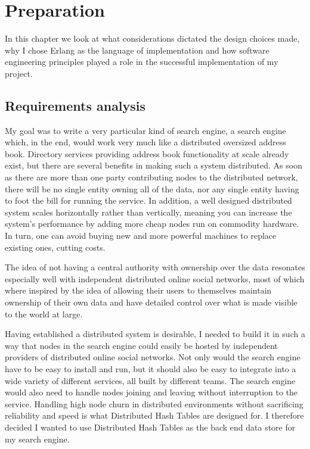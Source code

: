 

\chapter{Preparation}
In this chapter we look at what considerations dictated the design choices made, why I chose Erlang as the language of implementation and how software engineering principles played a role in the successful implementation of my project.

\section{Requirements analysis}
My goal was to write a very particular kind of search engine, a search engine which, in the end, would work very much like a distributed oversized address book.
Directory services providing address book functionality at scale already exist, but there are several benefits in making such a system distributed. As soon as there are more than one party contributing nodes to the distributed network, there will be no single entity owning all of the data, nor any single entity having to foot the bill for running the service. In addition, a well designed distributed system scales horizontally rather than vertically, meaning you can increase the system's performance by adding more cheap nodes run on commodity hardware. In turn, one can avoid buying new and more powerful machines to replace existing ones, cutting costs.

The idea of not having a central authority with ownership over the data resonates especially well with independent distributed online social networks, most of which where inspired by the idea of allowing their users to themselves maintain ownership of their own data and have detailed control over what is made visible to the world at large.

Having established a distributed system is desirable, I needed to build it in such a way that nodes in the search engine could easily be hosted by independent providers of distributed online social networks. Not only would the search engine have to be easy to install and run, but it should also be easy to integrate into a wide variety of different services, all built by different teams. The search engine would also need to handle nodes joining and leaving without interruption to the service.
Handling high node churn in distributed environments without sacrificing reliability and speed is what Distributed Hash Tables are designed for. I therefore decided I wanted to use Distributed Hash Tables as the back end data store for my search engine.

